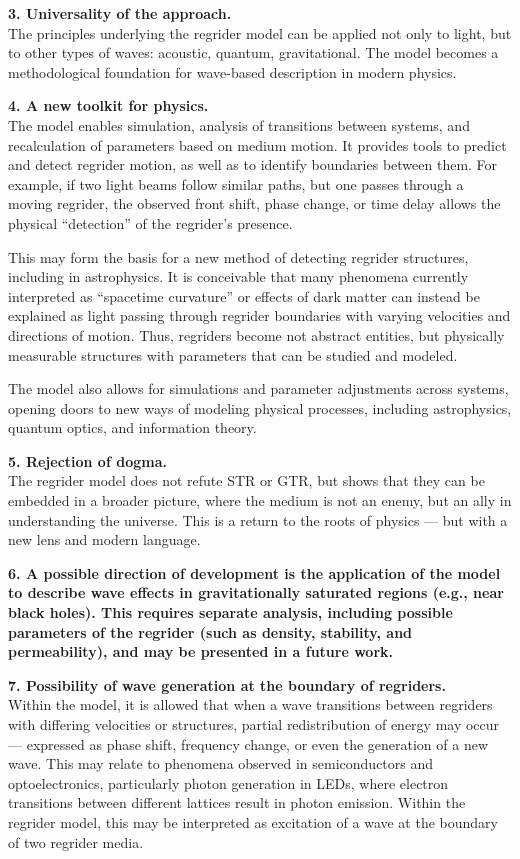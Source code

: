\documentclass[12pt]{article}
\begin{document}
\textbf{3. Universality of the approach.}\\
The principles underlying the regrider model can be applied not only to light, but to other types of waves: acoustic, quantum, gravitational. The model becomes a methodological foundation for wave-based description in modern physics.

\textbf{4. A new toolkit for physics.}\\
The model enables simulation, analysis of transitions between systems, and recalculation of parameters based on medium motion. It provides tools to predict and detect regrider motion, as well as to identify boundaries between them. For example, if two light beams follow similar paths, but one passes through a moving regrider, the observed front shift, phase change, or time delay allows the physical “detection” of the regrider’s presence.

This may form the basis for a new method of detecting regrider structures, including in astrophysics. It is conceivable that many phenomena currently interpreted as “spacetime curvature” or effects of dark matter can instead be explained as light passing through regrider boundaries with varying velocities and directions of motion. Thus, regriders become not abstract entities, but physically measurable structures with parameters that can be studied and modeled.

The model also allows for simulations and parameter adjustments across systems, opening doors to new ways of modeling physical processes, including astrophysics, quantum optics, and information theory.

\textbf{5. Rejection of dogma.}\\
The regrider model does not refute STR or GTR, but shows that they can be embedded in a broader picture, where the medium is not an enemy, but an ally in understanding the universe. This is a return to the roots of physics — but with a new lens and modern language.

\textbf{6. A possible direction of development is the application of the model to describe wave effects in gravitationally saturated regions (e.g., near black holes). This requires separate analysis, including possible parameters of the regrider (such as density, stability, and permeability), and may be presented in a future work.}

\textbf{7. Possibility of wave generation at the boundary of regriders.}\\
Within the model, it is allowed that when a wave transitions between regriders with differing velocities or structures, partial redistribution of energy may occur — expressed as phase shift, frequency change, or even the generation of a new wave. This may relate to phenomena observed in semiconductors and optoelectronics, particularly photon generation in LEDs, where electron transitions between different lattices result in photon emission. Within the regrider model, this may be interpreted as excitation of a wave at the boundary of two regrider media.
\end{document}
